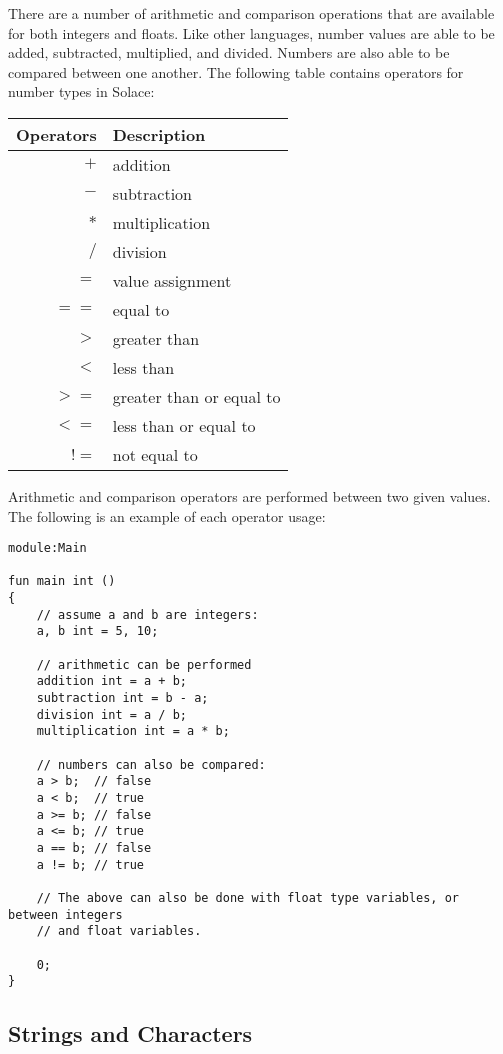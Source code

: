 \documentclass{article}
\begin{document}
There are a number of arithmetic and comparison operations that are available for both integers
and floats. Like other languages, number values are able to be added, subtracted, multiplied,
and divided. Numbers are also able to be compared between one another. The following table 
contains operators for number types in Solace:

\begin{center}
\begin{tabular}{|r|l|}
	\hline
	Operators & Description \\
	\hline
	\hline
	$+$ & addition \\
	$-$ & subtraction \\
	$*$ & multiplication \\
	$/$ & division \\
	\hline
	$=$ & value assignment \\
	$==$ & equal to \\
	$>$ & greater than \\
	$<$ & less than \\
	$>=$ & greater than or equal to \\
	$<=$ & less than or equal to \\
	$!=$ & not equal to \\
	\hline
\end{tabular}
\end{center}

Arithmetic and comparison operators are performed between two given values. The following
is an example of each operator usage:

\begin{lstlisting}
module:Main

fun main int ()
{
	// assume a and b are integers:
	a, b int = 5, 10;
	
	// arithmetic can be performed
	addition int = a + b;
	subtraction int = b - a;
	division int = a / b;
	multiplication int = a * b;
	
	// numbers can also be compared:
	a > b;  // false
	a < b;  // true
	a >= b; // false
	a <= b; // true
	a == b; // false
	a != b; // true
	
	// The above can also be done with float type variables, or between integers
	// and float variables.
	
	0;
}
\end{lstlisting}

\subsection{Strings and Characters}
\end{document}
